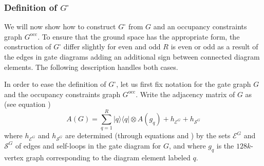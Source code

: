 \documentclass[../thesis-main/thesis-main]{subfiles}
\begin{document}
\subsubsection{Definition of $G^{\square}$\label{sec:g_square_def}}

We will now show how to construct $G^{\square}$ from $G$ and an occupancy constraints graph $G^{\text{occ}}$.  To ensure that the ground space has the appropriate form, the construction of $G^{\square}$ differ slightly for even and odd $R$ is even or odd as a result of the edges in gate diagrams adding an additional sign between connected diagram elements.  The following description handles both cases.

In order to ease the definition of $G^{\square}$, let us first fix notation for the gate graph $G$ and the occupancy constraints graph $G^{\text{occ}}$. Write the adjacency matrix of $G$ as (see equation ) 
\begin{equation}
A(G)=\sum_{q=1}^{R}|q\rangle\langle q|\otimes A(g_{q})+h_{\mathcal{E}^{G}}+h_{\mathcal{S}^{G}}
\end{equation}
where $h_{\mathcal{E}^{G}}$ and $h_{\mathcal{S}^{G}}$ are determined (through equations  and ) by the sets $\mathcal{E}^{G}$ and $\mathcal{S}^{G}$ of edges and self-loops in the gate diagram for $G$, and where $g_q$ is the $128k$-vertex graph corresponding to the diagram element labeled $q$.
\end{document}
